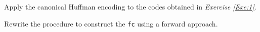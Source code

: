 \documentclass{subfiles}
\begin{document}
    \begin{exercise}
        Apply the canonical Huffman encoding to the codes obtained in \emph{Exercise \ref{Exe:1}}.
    \end{exercise}
    \begin{exercise}
        Rewrite the procedure to construct the \lstinline{fc} using a forward approach.
    \end{exercise}
\end{document}
